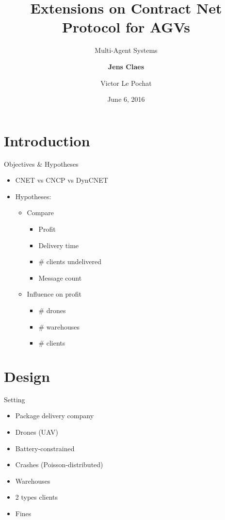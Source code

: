 \documentclass[notes]{beamer}
\title{Extensions on Contract Net Protocol for AGVs}
\subtitle{Multi-Agent Systems}
\author{\textbf{Jens Claes} \and Victor Le Pochat}
\date{June 6, 2016}
\begin{document}
	\frame{\titlepage}

	\section{Introduction}
	
	\begin{frame}{Objectives \& Hypotheses}
		\begin{itemize}
		\item CNET vs CNCP vs DynCNET
		\item Hypotheses:
			\begin{itemize}
			\item Compare
				\begin{itemize}
				\item Profit
				\item Delivery time
				\item \# clients undelivered
				\item Message count
				\end{itemize}
			\item Influence on profit
				\begin{itemize}
				\item \# drones
				\item \# warehouses
				\item \# clients
				\end{itemize}
			\end{itemize}
		\end{itemize}
	\end{frame}
		
	\section{Design}
	\begin{frame}{Setting}
		\begin{itemize}
		\item Package delivery company
		\item Drones (UAV)
		\item Battery-constrained
		\item Crashes (Poisson-distributed)
		\item Warehouses
		\item 2 types clients
		\item Fines
		\end{itemize}
	\end{frame}
	
	
\end{document}
